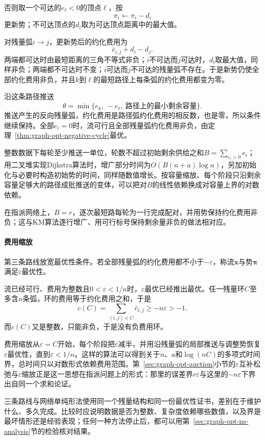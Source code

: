 否则取一个可达的$e_\ell<0$的顶点$\ell$，按
\begin{equation}
  \pi_i\gets\pi_i-d_i
  \label{eq:graph-opt-ssp-potential-update}
\end{equation}
更新势；不可达顶点的$d_i$取为可达顶点距离中的最大值。

对残量弧$i\to j$，更新势后的约化费用为
\[
  \bar c_{i,j}+d_i-d_j.
\]
两端都可达时由最短距离的三角不等式非负；$i$不可达而$j$可达时，$d_i$取最大值，同样非负；两端都不可达时不变；$i$可达而$j$不可达的残量弧不存在。于是新势仍使全部约化费用非负，并且$k$到$\ell$的最短路径上每条弧的约化费用都变为零。

沿这条路径推送
\[
  \theta=\min\{e_k,\ -e_\ell,\ \text{路径上的最小剩余容量}\}.
\]
推送产生的反向残量弧，约化费用是路径弧约化费用的相反数，也是零，所以条件继续保持。全部$e_i=0$时，流可行且全部残量弧约化费用非负，由定理~\ref{thm:graph-opt-negative-cycle}最优。

整数数据下每轮至少推送一单位，轮数不超过初始剩余供给之和$B=\sum_{e_i>0}e_i$；用二叉堆实现Dijkstra算法时，增广部分时间为$O(B(n+a)\log n)$，另加初始化与必要时构造初始势的时间，同样随数值增长。按容量缩放、每个阶段只沿剩余容量足够大的路径成批推送的变体，可以把对$B$的线性依赖换成对容量上界的对数依赖。

在指派网络上，$B=r$，逐次最短路每轮为一行完成配对，并用势保持约化费用非负；这与KM算法逐行增广、用可行标号保持剩余量非负的做法相对应。

\paragraph{费用缩放}
第三条路线放宽最优性条件。若全部残量弧的约化费用都不小于$-\varepsilon$，称流$\bm x$与势$\bm\pi$满足$\varepsilon$最优性。

流已经可行、费用为整数且$0<\varepsilon<1/n$时，$\varepsilon$最优已经推出最优。任一残量环$C$至多含$n$条弧，环的费用等于约化费用之和，于是
\[
  c(C)=\sum_{(i,j)\in C}\bar c_{i,j}\geq-n\varepsilon>-1.
\]
而$c(C)$又是整数，只能非负，于是没有负费用环。

费用缩放从$\varepsilon=C$开始，每个阶段把$\varepsilon$减半，并用沿残量弧的局部推送与调整势恢复$\varepsilon$最优性，直到$\varepsilon<1/n$。这样的算法可以得到关于$n$、$a$和$\log(nC)$的多项式时间界，总时间只以对数形式依赖费用范围。第~\ref{sec:graph-opt-auction}小节的$\varepsilon$互补松弛与$\varepsilon$缩放正是这一思想在指派问题上的形式：那里的误差界$r\varepsilon$与这里的$-n\varepsilon$下界出自同一个求和论证。

三条路线与网络单纯形法使用同一个残量结构和同一份最优性证书，差别在于维护什么、多久完成。比较时应说明数据是否为整数、复杂度依赖哪些数值，以及界是最坏情形还是经验表现；任何一种方法停止后，都可以用第~\ref{sec:graph-opt-ns-analysis}节的检验核对结果。


